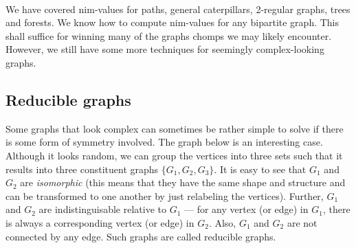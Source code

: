 \documentclass[a4paper, 12pt]{article}
\theoremstyle{remark} %
\begin{document}
\begin{center}
	\\
\end{center}

We have covered nim-values for paths, general caterpillars, 2-regular graphs, trees and forests. We know how to compute nim-values for any bipartite graph. This shall suffice for winning many of the graphs chomps we may likely encounter. However, we still have some more techniques for seemingly complex-looking graphs.

\subsection{Reducible graphs}

Some graphs that look complex can sometimes be rather simple to solve if there is some form of symmetry involved. The graph below is an interesting case. Although it looks random, we can group the vertices into three sets such that it results into three constituent graphs $\{G_1, G_2, G_3\}$. It is easy to see that $G_1$ and $G_2$ are \textit{isomorphic} (this means that they have the same shape and structure and can be transformed to one another by just relabeling the vertices). Further, $G_1$ and $G_2$ are indistinguisable relative to $G_1$ --- for any vertex (or edge) in $G_1$, there is always a corresponding vertex (or edge) in $G_2$. Also, $G_1$ and $G_2$ are not connected by any edge. Such graphs are called reducible graphs.
\end{document}
